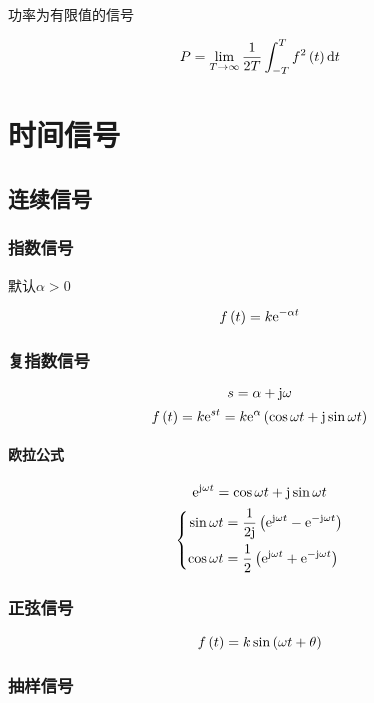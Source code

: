 \documentclass{article}
\begin{document}
功率为有限值的信号

\[P=\lim_{T\to\infty}\frac1{2T}\int_{-T}^Tf^2\left(t\right)\mathrm d t\]

\section{时间信号}

\subsection{连续信号}

\subsubsection{指数信号}

默认$\alpha>0$

\[f\left(t\right)=k\mathrm e^{-\alpha t}\]

\subsubsection{复指数信号}

\[s=\alpha+\mathrm j\omega\]
\[f\left(t\right)=k\mathrm e^{st}=k\mathrm e^\alpha\left(\cos\omega t+\mathrm j\sin\omega t\right)\]

\paragraph{欧拉公式}

\[\mathrm e^{\mathrm j\omega t}=\cos\omega t+\mathrm j\sin\omega t\]
\[\left\{\begin{aligned}
        \sin\omega t & =\frac1{2\mathrm j}\left(\mathrm e^{\mathrm j\omega t}-\mathrm e^{-\mathrm j\omega t}\right) \\
        \cos\omega t & =\frac12\left(\mathrm e^{\mathrm j\omega t}+\mathrm e^{-\mathrm j\omega t}\right)     \\
    \end{aligned}\right.\]

\subsubsection{正弦信号}

\[f\left(t\right)=k\sin\left(\omega t+\theta\right)\]

\subsubsection{抽样信号}

\begin{center}
\end{center}
\end{document}
